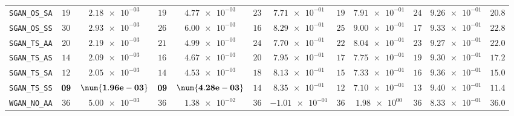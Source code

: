 \begin{xltabular}{\textwidth}{l||cC|cC|cC|cC|cC||c}
	\texttt{SGAN\_OS\_SA} & $ 19$ & $ \num{2.18e-03}$ & $ 19$ & $ \num{4.77e-03}$ & $ 23$ & $ \num{7.71e-01}$ & $ 19$ & $ \num{7.91e-01}$ & $ 24$ & $ \num{9.26e-01}$ & $ 20.8$  \\
	\texttt{SGAN\_OS\_SS} & $ 30$ & $ \num{2.93e-03}$ & $ 26$ & $ \num{6.00e-03}$ & $ 16$ & $ \num{8.29e-01}$ & $ 25$ & $ \num{9.00e-01}$ & $ 17$ & $ \num{9.33e-01}$ & $ 22.8$  \\
	\texttt{SGAN\_TS\_AA} & $ 20$ & $ \num{2.19e-03}$ & $ 21$ & $ \num{4.99e-03}$ & $ 24$ & $ \num{7.70e-01}$ & $ 22$ & $ \num{8.04e-01}$ & $ 23$ & $ \num{9.27e-01}$ & $ 22.0$  \\
	\texttt{SGAN\_TS\_AS} & $ 14$ & $ \num{2.09e-03}$ & $ 16$ & $ \num{4.67e-03}$ & $ 20$ & $ \num{7.95e-01}$ & $ 17$ & $ \num{7.75e-01}$ & $ 19$ & $ \num{9.30e-01}$ & $ 17.2$  \\
	\texttt{SGAN\_TS\_SA} & $ 12$ & $ \num{2.05e-03}$ & $ 14$ & $ \num{4.53e-03}$ & $ 18$ & $ \num{8.13e-01}$ & $ 15$ & $ \num{7.33e-01}$ & $ 16$ & $ \num{9.36e-01}$ & $ 15.0$  \\
	\texttt{SGAN\_TS\_SS} & $\bf 09$ & $\bf \num{1.96e-03}$ & $\bf 09$ & $\bf \num{4.28e-03}$ & $ 14$ & $ \num{8.35e-01}$ & $ 12$ & $ \num{7.10e-01}$ & $ 13$ & $ \num{9.40e-01}$ & $ 11.4$  \\ \hline
	\texttt{WGAN\_NO\_AA} & $ 36$ & $ \num{5.00e-03}$ & $ 36$ & $ \num{1.38e-02}$ & $ 36$ & $ \num{-1.01e-01}$ & $ 36$ & $ \num{1.98e+00}$ & $ 36$ & $ \num{8.33e-01}$ & $ 36.0$  \\

\end{xltabular}
